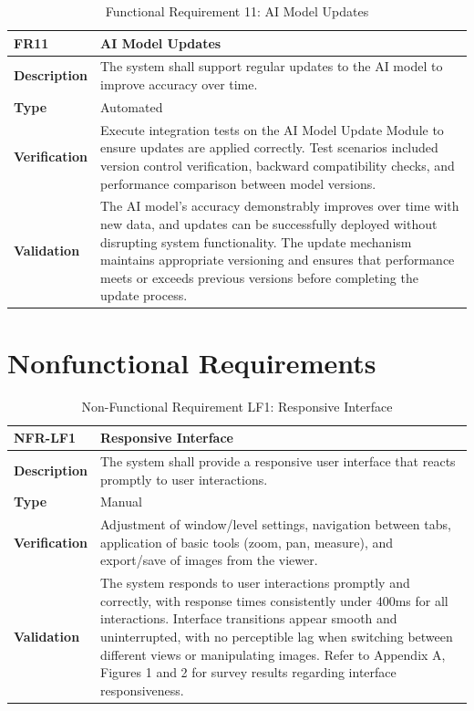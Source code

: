 \documentclass[12pt, titlepage]{article}
\begin{document}
\begin{table}[h!]
\centering
{}
\begin{tabular}{|p{3.5cm}|p{11.5cm}|}
\hline
\rowcolor{gray!30}
\textbf{FR11} & \textbf{AI Model Updates} \\
\hline
\textbf{Description} & The system shall support regular updates to the AI model to improve accuracy over time.\\
\hline
\textbf{Type} & Automated \\
\hline
\textbf{Verification} & Execute integration tests on the AI Model Update Module to ensure updates are applied correctly. Test scenarios included version control verification, backward compatibility checks, and performance comparison between model versions. \\
\hline
\textbf{Validation} & The AI model's accuracy demonstrably improves over time with new data, and updates can be successfully deployed without disrupting system functionality. The update mechanism maintains appropriate versioning and ensures that performance meets or exceeds previous versions before completing the update process. \\
\hline
\end{tabular}
\caption{Functional Requirement 11: AI Model Updates}
\end{table}

\clearpage
\newpage
\section{Nonfunctional Requirements}

\begin{table}[h!]
\centering
{}
\begin{tabular}{|p{3.5cm}|p{11.5cm}|}
\hline
\rowcolor{gray!30}
\textbf{NFR-LF1} & \textbf{Responsive Interface} \\
\hline
\textbf{Description} & The system shall provide a responsive user interface that reacts promptly to user interactions.\\
\hline
\textbf{Type} & Manual \\
\hline
\textbf{Verification} & Adjustment of window/level settings, navigation between tabs, application of basic tools (zoom, pan, measure), and export/save of images from the viewer. \\
\hline
\textbf{Validation} & The system responds to user interactions promptly and correctly, with response times consistently under 400ms for all interactions. Interface transitions appear smooth and uninterrupted, with no perceptible lag when switching between different views or manipulating images. Refer to Appendix A, Figures 1 and 2 for survey results regarding interface responsiveness. \\
\hline
\end{tabular}
\caption{Non-Functional Requirement LF1: Responsive Interface}
\end{table}
\end{document}
